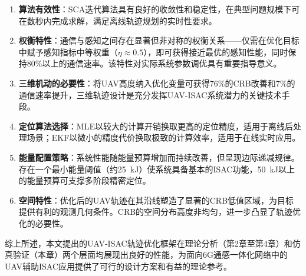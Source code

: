 \begin{enumerate}
\item \textbf{算法有效性}：SCA迭代算法具有良好的收敛性和稳定性，在典型问题规模下可在数秒内完成求解，满足离线轨迹规划的实时性要求。

\item \textbf{权衡特性}：通信与感知之间存在显著但非对称的权衡关系——仅需在优化目标中赋予感知指标中等权重（$\eta\approx0.5$），即可获得接近最优的感知性能，同时保持80\%以上的通信速率。该特性对实际系统参数调优具有重要指导意义。

\item \textbf{三维机动的必要性}：将UAV高度纳入优化变量可获得76\%的CRB改善和7\%的通信速率提升，三维轨迹设计是充分发挥UAV-ISAC系统潜力的关键技术手段。

\item \textbf{定位算法选择}：MLE以较大的计算开销换取更高的定位精度，适用于离线后处理场景；EKF以微小的精度代价换取极致的计算效率，适用于在线实时应用。

\item \textbf{能量配置策略}：系统性能随能量预算增加而持续改善，但呈现边际递减规律。存在一个最小能量阈值（约25~kJ）使系统具备基本的ISAC功能，50~kJ以上的能量预算可支撑多阶段精密定位。

\item \textbf{空间特性}：优化后的UAV轨迹在其沿线塑造了显著的CRB低值区域，为目标提供有利的观测几何条件。CRB的空间分布高度非均匀，进一步凸显了轨迹优化的必要性。
\end{enumerate}

综上所述，本文提出的UAV-ISAC轨迹优化框架在理论分析（第2章至第4章）和仿真验证（本章）两个层面均展现出良好的性能，为面向6G通感一体化网络中的UAV辅助ISAC应用提供了可行的设计方案和有益的理论参考。
